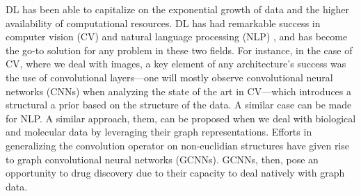 \documentclass{article}
\begin{document}
 
DL has been able to capitalize on the exponential growth of data and the higher
 availability of computational resources. DL has had remarkable success in computer
 vision (CV) \cite{Guo2016} and natural language processing (NLP) \cite{Young2018}, and
 has become the go-to solution for any problem in these two fields. For instance, in the
 case of CV, where we deal with images, a key element of any architecture's success was
 the use of convolutional layers---one will mostly observe convolutional neural networks
 (CNNs) when analyzing the state of the art in CV---which introduces a structural a
 prior based on the structure of the data\cite{Fukushima1980, LeCun1989, Ulyanov}. A
 similar case can be made for NLP. A similar approach, them, can be proposed when we
 deal with biological and molecular data by leveraging their graph representations.
 Efforts in generalizing the convolution operator on non-euclidian structures have given
 rise to graph convolutional neural networks (GCNNs)\cite{Wu2019}. GCNNs, then, pose an
 opportunity to drug discovery due to their capacity to deal natively with graph
 data\cite{Sun2019}.






\end{document}
